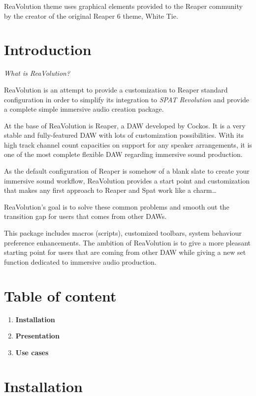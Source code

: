 \documentclass[
  letterpaper,
  DIV=11,
  numbers=noendperiod]{scrreport}
\providecommand{\tightlist}{%
  \setlength{\itemsep}{0pt}\setlength{\parskip}{0pt}}\usepackage{longtable,booktabs,array}
\begin{document}
ReaVolution theme uses graphical elements provided to the Reaper
community by the creator of the original Reaper 6 theme, White Tie.

\hypertarget{introduction-2}{%
\section{Introduction}\label{introduction-2}}

\emph{What is ReaVolution?}

ReaVolution is an attempt to provide a customization to Reaper standard
configuration in order to simplify its integration to \emph{SPAT
Revolution} and provide a complete simple immersive audio creation
package.

At the base of ReaVolution is Reaper, a DAW developed by Cockos. It is a
very stable and fully-featured DAW with lots of customization
possibilities. With its high track channel count capacities on support
for any speaker arrangements, it is one of the most complete flexible
DAW regarding immersive sound production.

As the default configuration of Reaper is somehow of a blank slate to
create your immersive sound workflow, ReaVolution provides a start point
and customization that makes any first approach to Reaper and Spat work
like a charm\ldots{}

ReaVolution's goal is to solve these common problems and smooth out the
transition gap for users that comes from other DAWs.

This package includes macros (scripts), customized toolbars, system
behaviour preference enhancements. The ambition of ReaVolution is to
give a more pleasant starting point for users that are coming from other
DAW while giving a new set function dedicated to immersive audio
production.

\hypertarget{table-of-content}{%
\section{Table of content}\label{table-of-content}}

\begin{enumerate}
\def\labelenumi{\arabic{enumi}.}
\tightlist
\item
  \textbf{Installation}
\item
  \textbf{Presentation}
\item
  \textbf{Use cases}
\end{enumerate}

\hypertarget{installation}{%
\section{Installation}\label{installation}}
\end{document}

